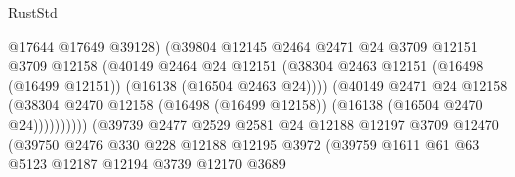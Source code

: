 \begin{lexlean}{RustStd}
\begin{coremodule}
                                          @17644
                                          @17649
                                          @39128)
                                        (@39804
                                          @12145
                                          @2464
                                          @2471
                                          @24
                                          @3709
                                          @12151
                                          @3709
                                          @12158
                                          (@40149
                                            @2464
                                            @24
                                            @12151
                                            (@38304
                                              @2463
                                              @12151
                                              (@16498 (@16499 @12151))
                                              (@16138 (@16504 @2463 @24))))
                                          (@40149
                                            @2471
                                            @24
                                            @12158
                                            (@38304
                                              @2470
                                              @12158
                                              (@16498 (@16499 @12158))
                                              (@16138 (@16504 @2470 @24))))))))))
                              (@39739
                                @2477
                                @2529
                                @2581
                                @24
                                @12188
                                @12197
                                @3709
                                @12470
                                (@39750
                                  @2476
                                  @330
                                  @228
                                  @12188
                                  @12195
                                  @3972
                                  (@39759
                                    @1611
                                    @61
                                    @63
                                    @5123
                                    @12187
                                    @12194
                                    @3739
                                    @12170
                                    @3689

\end{coremodule}
\end{lexlean}
